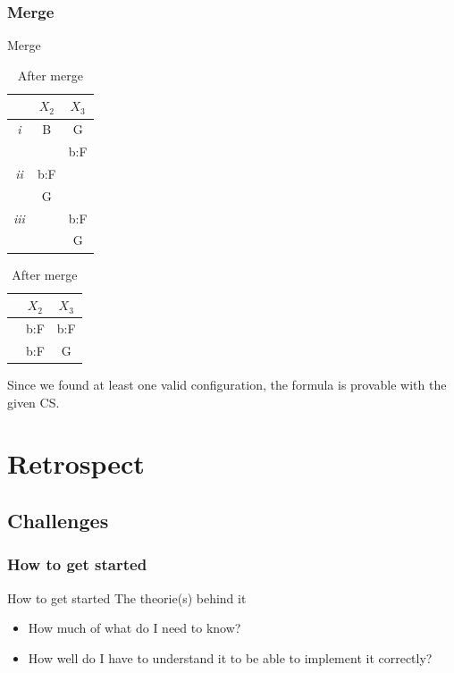 \documentclass{beamer}
\begin{document}
\subsubsection{Merge}
\begin{frame}{Merge}
	\begin{table}
	\parbox{.35\linewidth}{
	\centering
		\begin{tabular}{c c c}
		 & $X_2$ & $X_3$ \\
	 	\hline
	 	\emph{i}   & B & G \\
	 	  &  & b:F\\
	 	\hline	  
	 	\emph{ii}  & b:F &\\
	 	&G&\\
	 	\hline
	 	\emph{iii}  & &b:F\\
	 	&&G\\
	 	\hline 
		\end{tabular}
	\caption{Before merge}
	}
	\hfill
	\parbox{.6\linewidth}{
	\centering
	\begin{tabular}{c c c}
		 & $X_2$ & $X_3$ \\
	 	\hline
	 	& b:F & b:F\\
	 	&b:F &G\\
	 	\hline 
	\end{tabular}
	\caption{After merge}
	}
	\end{table}
	Since we found at least one valid configuration, the formula is provable with the given CS.
\end{frame}

\section{Retrospect}
\subsection{Challenges}
\subsubsection{How to get started}
\begin{frame}{How to get started}
The theorie(s) behind it	
	\begin{itemize}
		\item How much of what do I need to know? 
		\item How well do I have to understand it to be able to implement it correctly?
	\end{itemize}
\end{frame}
\end{document}
